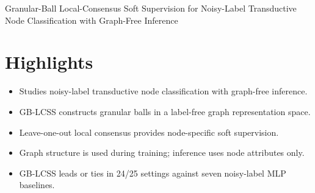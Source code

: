 \documentclass[10pt,letterpaper]{article}
\begin{document}
\begin{center}
{\large Granular-Ball Local-Consensus Soft Supervision for Noisy-Label
Transductive Node Classification with Graph-Free Inference}
\end{center}
\section*{Highlights}
\begin{itemize}
\item Studies noisy-label transductive node classification with graph-free inference.
\item GB-LCSS constructs granular balls in a label-free graph representation space.
\item Leave-one-out local consensus provides node-specific soft supervision.
\item Graph structure is used during training; inference uses node attributes only.
\item GB-LCSS leads or ties in 24/25 settings against seven noisy-label MLP baselines.
\end{itemize}
\end{document}
